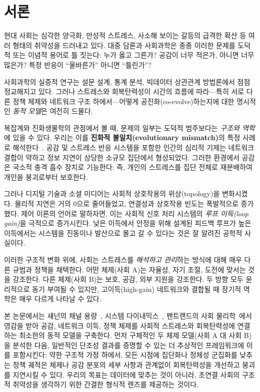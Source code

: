 \documentclass[11pt]{article}
\theoremstyle{plain}
\begin{document}
\section{서론}

현대 사회는 심각한 양극화, 만성적 스트레스, 사소해 보이는 갈등의 급격한 확산 등 여러 형태의 취약성을 드러내고 있다.
대중 담론과 사회과학은 종종 이러한 문제를 도덕적 또는 이념적 용어로 틀 짓는다:
누가 옳고 그른가?
공감이 너무 적은가, 아니면 너무 많은가?
특정 반응이 ``올바른가'' 아니면 ``틀린가''?

사회과학의 실증적 연구는 설문 설계, 통계 분석, 빅데이터 상관관계 방법론에서 점점 정교해지고 있다.
그러나 스트레스와 회복탄력성이 시간의 흐름에 따라---특히 서로 다른 정책 체제와 네트워크 구조 하에서---어떻게 공진화(co-evolve)하는지에 대한 명시적인 \emph{동적 모델}은 여전히 드물다.

복잡계와 진화생물학의 관점에서 볼 때, 문제의 일부는 도덕적 범주보다는 \emph{구조와 역학}에 있을 수 있다.
우리는 이를 \textbf{진화적 불일치(evolutionary mismatch)}의 특정 사례로 해석한다~\cite{lloyd2011evolutionary}.
공감 및 스트레스 반응 시스템을 포함한 인간의 심리적 기제는 네트워크 결합이 약하고 정보 지연이 상당한 소규모 집단에서 형성되었다.
그러한 환경에서 공감은 국소적 충격 흡수 장치로 기능한다: 즉, 개인의 스트레스를 집단 전체로 재분배하여 개인을 붕괴로부터 보호한다.

그러나 디지털 기술과 소셜 미디어는 사회적 상호작용의 위상(topology)을 변화시켰다.
물리적 지연은 거의 0으로 줄어들었고, 연결성과 상호작용 빈도는 폭발적으로 증가했다.
제어 이론의 언어로 말하자면, 이는 사회적 신호 처리 시스템의 \emph{루프 이득(loop gain)}을 극적으로 증가시킨다.
낮은 이득에서 안정을 위해 설계된 피드백 루프가 높은 이득에서는 시스템을 진동이나 발산으로 몰고 갈 수 있다는 것은 잘 알려진 공학적 사실이다.

이러한 구조적 변화 위에, 사회는 스트레스를 \emph{해석하고 관리}하는 방식에 대해 매우 다른 규범과 정책을 채택한다.
어떤 체제(사회 A)는 자율성, 자기 조절, 도전에 맞서는 것을 강조한다.
다른 체제(사회 B)는 보호, 공감, 외부 지원을 강조한다.
두 방향 모두 윤리적으로 동기 부여될 수 있지만, 고이득(high-gain) 네트워크와 결합될 때 장기적 역학은 매우 다르게 나타날 수 있다.

본 논문에서는 섀넌의 채널 용량~\cite{shannon1948}, 시스템 다이내믹스~\cite{forrester1961,forrester1971}, 펜트랜드의 사회 물리학~\cite{pentland2014}에서 영감을 받아 공감, 네트워크 이득, 정책 체제를 사회적 스트레스와 회복탄력성에 연결하는 최소한의 동적 모델을 구축한다.
먼저 구체적인 두 체제 모델(사회 A 대 사회 B)을 분석한 다음, 일반적인 단조성 결과를 증명할 수 있는 더 추상적인 프레임워크에 이를 포함시킨다:
약한 구조적 가정 하에서, 모든 시점에 집단화나 정체성 군집화를 낮추는 정책 궤적은 체제나 공감 분포의 세부 사항과 관계없이 회복탄력성을 개선하고 붕괴를 지연시킬 수 있다.
우리의 목표는 데이터에 맞추는 것이 아니라, 초연결 사회의 구조적 취약성을 생각하기 위한 간결한 형식적 렌즈를 제공하는 것이다.
\end{document}
